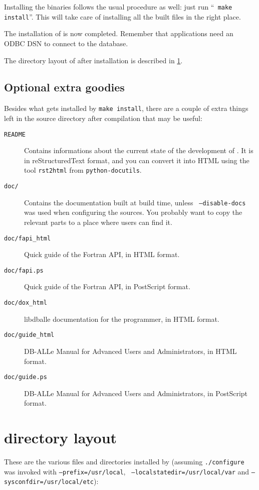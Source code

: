 Installing the binaries follows the usual procedure as well: just run ``{\tt
make install}''.  This will take care of installing all the built files in the
right place.

The installation of \dballe{} is now completed.  Remember that \dballe{}
applications need an ODBC DSN to connect to the database.

The directory layout of \dballe{} after installation is described in
\ref{install-dir-layout}.


\subsection{Optional extra goodies}

Besides what gets installed by {\tt make install}, there are a couple of extra
things left in the source directory after compilation that may be useful:

\begin{description}
\item[{\tt README}] Contains informations about the current state of the
	development of \dballe{}.  It is in reStructuredText format, and you
	can convert it into HTML using the tool {\tt rst2html} from
	{\tt python-docutils}.
\item[{\tt doc/}] Contains the documentation built at build time, unless {\tt
	--disable-docs} was used when configuring the sources.  You probably
	want to copy the relevant parts to a place where users can find it.
\item[{\tt doc/fapi\_html}] Quick guide of the Fortran API, in HTML format.
\item[{\tt doc/fapi.ps}] Quick guide of the Fortran API, in PostScript format.
\item[{\tt doc/dox\_html}] libdballe documentation for the programmer, in HTML format.
\item[{\tt doc/guide\_html}] DB-ALLe Manual for Advanced Users and Administrators, in HTML format.
\item[{\tt doc/guide.ps}] DB-ALLe Manual for Advanced Users and Administrators, in PostScript format.
\end{description}


\section {\dballe{} directory layout}
\label{install-dir-layout}

These are the various files and directories installed by \dballe{} (assuming
{\tt ./configure} was invoked with {\tt --prefix=/usr/local}, {\tt
--localstatedir=/usr/local/var} and {\tt --sysconfdir=/usr/local/etc}):

